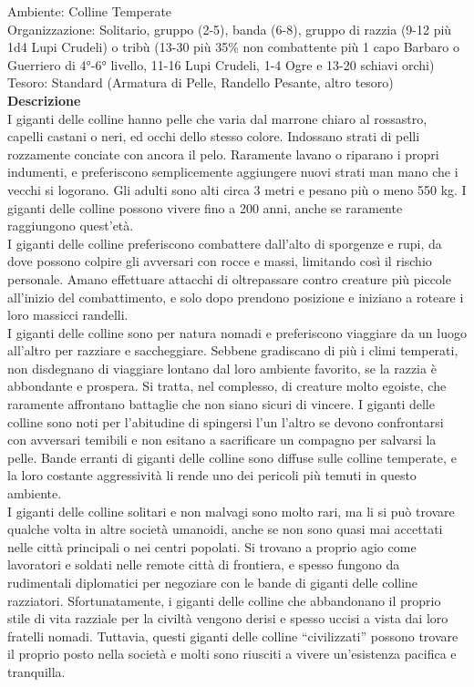 \begin{multicols}{2}
Ambiente: Colline Temperate\\
Organizzazione: Solitario, gruppo (2-5), banda (6-8), gruppo di razzia (9-12 più 1d4 Lupi Crudeli) o tribù (13-30 più 35\% non combattente più 1 capo Barbaro o Guerriero di 4°-6° livello, 11-16 Lupi Crudeli, 1-4 Ogre e 13-20 schiavi orchi)\\
Tesoro: Standard (Armatura di Pelle, Randello Pesante, altro tesoro)\\
\textbf{Descrizione}\\
I giganti delle colline hanno pelle che varia dal marrone chiaro al rossastro, capelli castani o neri, ed occhi dello stesso colore. Indossano strati di pelli rozzamente conciate con ancora il pelo. Raramente lavano o riparano i propri indumenti, e preferiscono semplicemente aggiungere nuovi strati man mano che i vecchi si logorano. Gli adulti sono alti circa 3 metri e pesano più o meno 550 kg. I giganti delle colline possono vivere fino a 200 anni, anche se raramente raggiungono quest’età.\\
I giganti delle colline preferiscono combattere dall’alto di sporgenze e rupi, da dove possono colpire gli avversari con rocce e massi, limitando così il rischio personale. Amano effettuare attacchi di oltrepassare contro creature più piccole all’inizio del combattimento, e solo dopo prendono posizione e iniziano a roteare i loro massicci randelli.\\
I giganti delle colline sono per natura nomadi e preferiscono viaggiare da un luogo all’altro per razziare e saccheggiare. Sebbene gradiscano di più i climi temperati, non disdegnano di viaggiare lontano dal loro ambiente favorito, se la razzia è abbondante e prospera. Si tratta, nel complesso, di creature molto egoiste, che raramente affrontano battaglie che non siano sicuri di vincere. I giganti delle colline sono noti per l’abitudine di spingersi l’un l’altro se devono confrontarsi con avversari temibili e non esitano a sacrificare un compagno per salvarsi la pelle. Bande erranti di giganti delle colline sono diffuse sulle colline temperate, e la loro costante aggressività li rende uno dei pericoli più temuti in questo ambiente.\\

I giganti delle colline solitari e non malvagi sono molto rari, ma li si può trovare qualche volta in altre società umanoidi, anche se non sono quasi mai accettati nelle città principali o nei centri popolati. Si trovano a proprio agio come lavoratori e soldati nelle remote città di frontiera, e spesso fungono da rudimentali diplomatici per negoziare con le bande di giganti delle colline razziatori. Sfortunatamente, i giganti delle colline che abbandonano il proprio stile di vita razziale per la civiltà vengono derisi e spesso uccisi a vista dai loro fratelli nomadi. Tuttavia, questi giganti delle colline “civilizzati” possono trovare il proprio posto nella società e molti sono riusciti a vivere un’esistenza pacifica e tranquilla.\\


\end{multicols}
